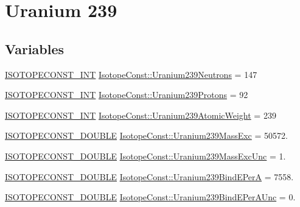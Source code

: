 \hypertarget{group___isotope_const-_uranium-_u239}{}\section{Uranium 239}
\label{group___isotope_const-_uranium-_u239}
\subsection*{Variables}
\begin{DoxyCompactItemize}
\item 
\mbox{\hyperlink{group___isotope_const-_macros_ga5f18360b3e99483a35c32d789e62621c}{I\+S\+O\+T\+O\+P\+E\+C\+O\+N\+S\+T\+\_\+\+I\+NT}} \mbox{\hyperlink{group___isotope_const-_uranium-_u239_ga77c3ea6fc7a83e2078c499b6719a6969}{Isotope\+Const\+::\+Uranium239\+Neutrons}} = 147
\item 
\mbox{\hyperlink{group___isotope_const-_macros_ga5f18360b3e99483a35c32d789e62621c}{I\+S\+O\+T\+O\+P\+E\+C\+O\+N\+S\+T\+\_\+\+I\+NT}} \mbox{\hyperlink{group___isotope_const-_uranium-_u239_gaff61ad23e900a291fe92f4224073fefc}{Isotope\+Const\+::\+Uranium239\+Protons}} = 92
\item 
\mbox{\hyperlink{group___isotope_const-_macros_ga5f18360b3e99483a35c32d789e62621c}{I\+S\+O\+T\+O\+P\+E\+C\+O\+N\+S\+T\+\_\+\+I\+NT}} \mbox{\hyperlink{group___isotope_const-_uranium-_u239_gaeecaf8313d752aeff858a93862df791b}{Isotope\+Const\+::\+Uranium239\+Atomic\+Weight}} = 239
\item 
\mbox{\hyperlink{group___isotope_const-_macros_ga8f45a7272ce02c0b4c65c44636ed719a}{I\+S\+O\+T\+O\+P\+E\+C\+O\+N\+S\+T\+\_\+\+D\+O\+U\+B\+LE}} \mbox{\hyperlink{group___isotope_const-_uranium-_u239_ga7ee8fc47f92cbef072d460e3c5b39d10}{Isotope\+Const\+::\+Uranium239\+Mass\+Exc}} = 50572.
\item 
\mbox{\hyperlink{group___isotope_const-_macros_ga8f45a7272ce02c0b4c65c44636ed719a}{I\+S\+O\+T\+O\+P\+E\+C\+O\+N\+S\+T\+\_\+\+D\+O\+U\+B\+LE}} \mbox{\hyperlink{group___isotope_const-_uranium-_u239_ga06365669b8343a043cba26bfb385060c}{Isotope\+Const\+::\+Uranium239\+Mass\+Exc\+Unc}} = 1.
\item 
\mbox{\hyperlink{group___isotope_const-_macros_ga8f45a7272ce02c0b4c65c44636ed719a}{I\+S\+O\+T\+O\+P\+E\+C\+O\+N\+S\+T\+\_\+\+D\+O\+U\+B\+LE}} \mbox{\hyperlink{group___isotope_const-_uranium-_u239_gab18a76cd79ba4233da2ca3d5a21d53dc}{Isotope\+Const\+::\+Uranium239\+Bind\+E\+PerA}} = 7558.
\item 
\mbox{\hyperlink{group___isotope_const-_macros_ga8f45a7272ce02c0b4c65c44636ed719a}{I\+S\+O\+T\+O\+P\+E\+C\+O\+N\+S\+T\+\_\+\+D\+O\+U\+B\+LE}} \mbox{\hyperlink{group___isotope_const-_uranium-_u239_gab3dc44440c6fa0f3f7d2cc750df831fa}{Isotope\+Const\+::\+Uranium239\+Bind\+E\+Per\+A\+Unc}} = 0.

\end{DoxyCompactItemize}
